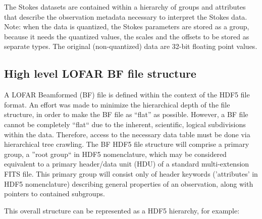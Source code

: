 \documentclass[a4paper,10pt,bibtotoc]{scrartcl}
\begin{document}
The Stokes datasets are contained within a hierarchy of groups and attributes that describe the observation metadata necessary to interpret the Stokes data. Note: when the data is quantized, the Stokes parameters are stored as a group, because it needs the quantized values, the scales and the offsets to be stored as separate types. The original (non-quantized) data are 32-bit floating point values.

\subsection{High level LOFAR BF file structure}
\label{sec:High level LOFAR BF file structure}

A LOFAR Beamformed (BF) file is defined within the context of the HDF5 file format. An effort was made to
minimize the hierarchical depth of the file structure, in order to make the BF file as ``flat'' as possible.
However, a BF file cannot be completely ``flat`` due to the inherent, scientific, logical subdivisions within
the data. Therefore, access to the necessary data table must be done via hierarchical tree crawling.
The BF HDF5 file structure will comprise a primary group, a ''root group`` in HDF5 nomenclature, which
may be considered equivalent to a primary header/data unit (HDU) of a standard multi-extension FITS file.
This primary group will consist only of header keywords ('attributes' in HDF5 nomenclature) describing
general properties of an observation, along with pointers to contained subgroups.

This overall structure can be represented as a HDF5 hierarchy, for example:
\end{document}
